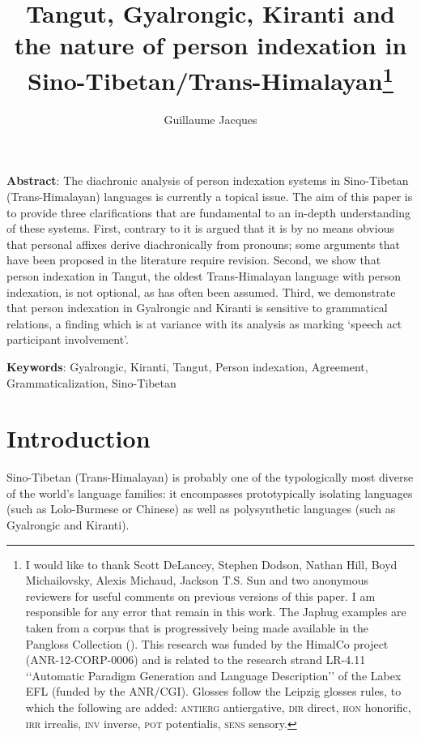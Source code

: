 \documentclass[oldfontcommands,oneside,a4paper,11pt]{article}
\begin{document}
 
\title{Tangut, Gyalrongic, Kiranti and the nature of person indexation in Sino-Tibetan/Trans-Himalayan\footnote{I would like to thank Scott DeLancey, Stephen Dodson, Nathan Hill, Boyd Michailovsky, Alexis Michaud, Jackson T.S. Sun and two anonymous reviewers for useful comments on previous versions of this paper. I am responsible for any error that remain in this work. The Japhug examples are taken from a corpus that is progressively being made available in the Pangloss Collection (\citealt{michailovsky14pangloss}). This research was funded by the HimalCo project (ANR-12-CORP-0006) and is related to the research strand LR-4.11 ‘‘Automatic Paradigm Generation and Language Description’’ of the Labex EFL (funded by the ANR/CGI). Glosses follow the Leipzig glosses rules, to which the following are added: \textsc{antierg} antiergative, \textsc{dir} direct, \textsc{hon} honorific, \textsc{irr} irrealis, \textsc{inv} inverse, \textsc{pot} potentialis, \textsc{sens} sensory.}}
\author{Guillaume Jacques}
\maketitle

\textbf{Abstract}: The diachronic analysis of person indexation systems in Sino-Tibetan (Trans-Himalayan) languages is currently a topical issue. The aim of this paper is to provide three clarifications that are fundamental to an in-depth understanding of these systems. First, contrary to it is argued that it is by no means obvious that personal affixes derive diachronically from pronouns; some arguments that have been proposed in the literature require revision. Second, we show that person indexation in Tangut, the oldest Trans-Himalayan language with person indexation, is not optional, as has often been assumed. Third, we demonstrate that person indexation in Gyalrongic and Kiranti is sensitive to grammatical relations, a finding which is at variance with its analysis as marking `speech act participant involvement'.

\textbf{Keywords}: Gyalrongic, Kiranti, Tangut, Person indexation, Agreement, Grammaticalization, Sino-Tibetan

\section{Introduction}
Sino-Tibetan (Trans-Himalayan) is probably one of the typologically most diverse of the world's language families: it encompasses prototypically isolating languages (such as Lolo-Burmese or Chinese) as well as polysynthetic languages (such as Gyalrongic and Kiranti). 
\end{document}
